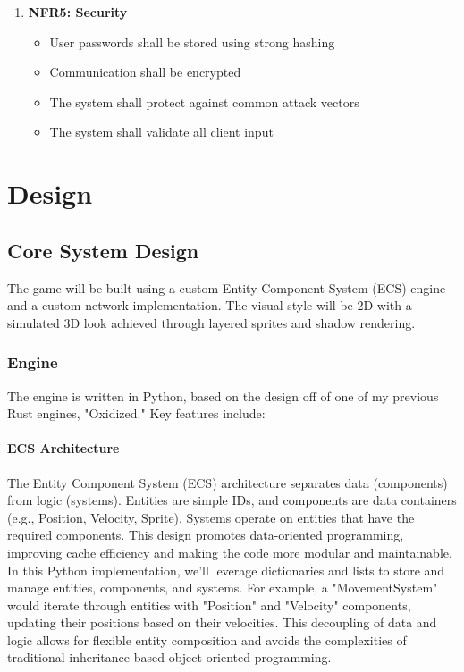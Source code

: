 \documentclass{article}
\begin{document}
\begin{enumerate}
    \item \textbf{NFR5: Security}
    \begin{itemize}
        \item User passwords shall be stored using strong hashing
        \item Communication shall be encrypted
        \item The system shall protect against common attack vectors
        \item The system shall validate all client input
    \end{itemize}
\end{enumerate}

\section{Design}

\subsection{Core System Design}

The game will be built using a custom Entity Component System (ECS) engine and a custom network implementation. The visual style will be 2D with a simulated 3D look achieved through layered sprites and shadow rendering.

\subsubsection{Engine}

The engine is written in Python, based on the design off of one of my previous Rust engines, "Oxidized." Key features include:

\paragraph{ECS Architecture} 

The Entity Component System (ECS) architecture separates data (components) from logic (systems). Entities are simple IDs, and components are data containers (e.g., Position, Velocity, Sprite). Systems operate on entities that have the required components. This design promotes data-oriented programming, improving cache efficiency and making the code more modular and maintainable. In this Python implementation, we'll leverage dictionaries and lists to store and manage entities, components, and systems. For example, a "MovementSystem" would iterate through entities with "Position" and "Velocity" components, updating their positions based on their velocities. This decoupling of data and logic allows for flexible entity composition and avoids the complexities of traditional inheritance-based object-oriented programming.
\end{document}
